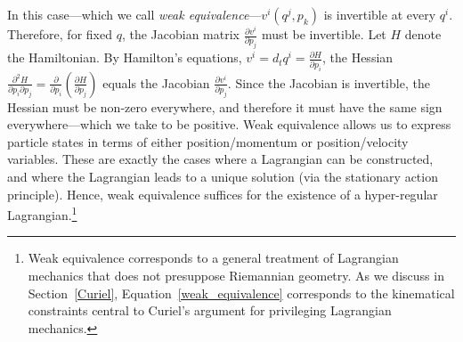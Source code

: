 \documentclass[letterpaper]{article}
\begin{document}
In this case---which we call \textit{weak equivalence}---$v^i(q^j, p_k)$ is invertible at every $q^i$. Therefore, for fixed $q$, the Jacobian matrix  $\frac{\partial v^i}{\partial p_j}$ must be invertible. Let $H$ denote the Hamiltonian. By Hamilton's equations, $v^i = d_t q^i = \frac{\partial H}{\partial p_i}$, the Hessian $\frac{\partial^2 H}{\partial p_i \partial p_j} = \frac{\partial}{\partial p_i} (\frac{\partial H}{\partial p_j})$ equals the Jacobian $\frac{\partial v^i}{\partial p_j}$. Since the Jacobian is invertible, the Hessian must be non-zero everywhere, and therefore it must have the same sign everywhere---which we take to be positive. Weak equivalence allows us to express particle states in terms of either position/momentum or position/velocity variables. These are exactly the cases where a Lagrangian can be constructed, and where the Lagrangian leads to a unique solution (via the stationary action principle). Hence, weak equivalence suffices for the existence of a hyper-regular Lagrangian.\footnote{Weak equivalence corresponds to a general treatment of Lagrangian mechanics that does not presuppose Riemannian geometry. As we discuss in Section~\ref{Curiel}, Equation~\ref{weak_equivalence} corresponds to the kinematical constraints central to Curiel's \parencites*[]{Curiel} argument for privileging Lagrangian mechanics.}
\end{document}
